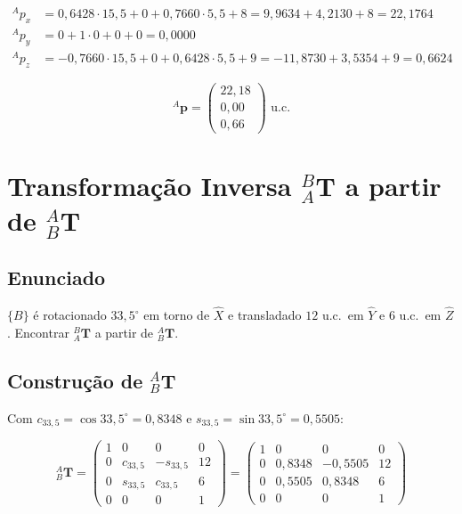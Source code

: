 \documentclass[12pt,a4paper]{article}
\newcommand{\Trans}[2]{{}^{#1}_{#2}\!\mathbf{T}}
\newcommand{\degr}{^{\circ}}
\begin{document}
\begin{align*}
  {}^{A}p_x &= 0{,}6428 \cdot 15{,}5 + 0 + 0{,}7660 \cdot 5{,}5 + 8
             = 9{,}9634 + 4{,}2130 + 8 = 22{,}1764 \\[4pt]
  {}^{A}p_y &= 0 + 1\cdot 0 + 0 + 0 = 0{,}0000 \\[4pt]
  {}^{A}p_z &= -0{,}7660 \cdot 15{,}5 + 0 + 0{,}6428 \cdot 5{,}5 + 9
             = -11{,}8730 + 3{,}5354 + 9 = 0{,}6624
\end{align*}

\begin{tcolorbox}[resultbox]
\[
  {}^{A}\mathbf{p} =
  \begin{pmatrix} 22{,}18 \\ 0{,}00 \\ 0{,}66 \end{pmatrix} \text{ u.c.}
\]
\end{tcolorbox}

\newpage

\section{Transformação Inversa ${}^{B}_{A}\mathbf{T}$ a partir de ${}^{A}_{B}\mathbf{T}$}

\subsection*{Enunciado}
$\{B\}$ é rotacionado $33{,}5\degr$ em torno de $\hat{X}$ e transladado $12$ u.c.\ em $\hat{Y}$ e $6$ u.c.\ em $\hat{Z}$.
Encontrar ${}^{B}_{A}\mathbf{T}$ a partir de ${}^{A}_{B}\mathbf{T}$.

\subsection{Construção de ${}^{A}_{B}\mathbf{T}$}

Com $c_{33{,}5} = \cos 33{,}5\degr = 0{,}8348$ e $s_{33{,}5} = \sin 33{,}5\degr = 0{,}5505$:

\[
\Trans{A}{B} =
\begin{pmatrix}
  1 & 0            & 0             & 0  \\
  0 & c_{33{,}5}  & -s_{33{,}5}   & 12 \\
  0 & s_{33{,}5}  &  c_{33{,}5}   &  6 \\
  0 & 0            & 0             &  1
\end{pmatrix}
=
\begin{pmatrix}
  1 & 0       & 0        &  0 \\
  0 & 0{,}8348 & -0{,}5505 & 12 \\
  0 & 0{,}5505 &  0{,}8348 &  6 \\
  0 & 0       & 0        &  1
\end{pmatrix}
\]
\end{document}

